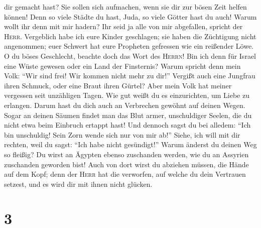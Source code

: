 dir gemacht hast? Sie sollen sich aufmachen, wenn sie dir zur bösen Zeit
helfen können! Denn so viele Städte du hast, Juda, so viele Götter hast
du auch!  Warum wollt ihr denn mit mir hadern? Ihr seid
ja alle von mir abgefallen, spricht der \textsc{Herr}. 
Vergeblich habe ich eure Kinder geschlagen; sie haben die Züchtigung
nicht angenommen; euer Schwert hat eure Propheten gefressen wie ein
reißender Löwe.  O du böses Geschlecht, beachte doch das
Wort des \textsc{Herrn}! Bin ich denn für Israel eine Wüste gewesen oder
ein Land der Finsternis? Warum spricht denn mein Volk: ``Wir sind frei!
Wir kommen nicht mehr zu dir!''  Vergißt auch eine
Jungfrau ihren Schmuck, oder eine Braut ihren Gürtel? Aber mein Volk hat
meiner vergessen seit unzähligen Tagen.  Wie gut weißt du
es einzurichten, um Liebe zu erlangen. Darum hast du dich auch an
Verbrechen gewöhnt auf deinen Wegen.  Sogar an deinen
Säumen findet man das Blut armer, unschuldiger Seelen, die du nicht etwa
beim Einbruch ertappt hast!  Und dennoch sagst du bei
alledem: ``Ich bin unschuldig! Sein Zorn wende sich nur von mir ab!''
Siehe, ich will mit dir rechten, weil du sagst: ``Ich habe nicht
gesündigt!''  Warum änderst du deinen Weg so fleißig? Du
wirst an Ägypten ebenso zuschanden werden, wie du an Assyrien zuschanden
geworden bist!  Auch von dort wirst du abziehen müssen,
die Hände auf dem Kopf; denn der \textsc{Herr} hat die verworfen, auf
welche du dein Vertrauen setzest, und es wird dir mit ihnen nicht
glücken.

\hypertarget{section-2}{%
\section{3}\label{section-2}}

